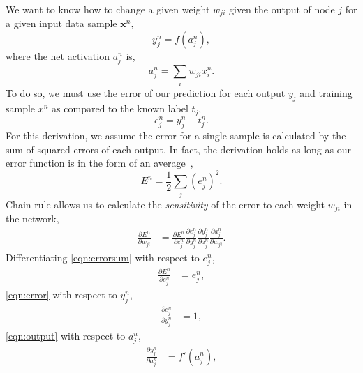 \documentclass[thesis]{subfiles}
\begin{document}
We want to know how to change a given weight $w_{ji}$ given the output of node $j$ for a given input data sample $\mathbf{x}^n$, 
\begin{equation}
	y^n_j = f\left( a^n_j \right),
	\label{eqn:output}
\end{equation}
where the net activation $a^n_j$ is,
\begin{equation}
	a^n_j = \sum_i w_{ji} x^n_{i}.
	\label{eqn:weightsum}
\end{equation}
To do so, we must use the error of our prediction for each output $y_j$ and training sample $x^n$ as compared to the known label $t_j$,
\begin{equation}
    e^n_j = y^n_j - t^n_j.
    \label{eqn:error}
\end{equation}
%
For this derivation, we assume the error for a single sample is calculated by the sum of squared errors of each output. In fact, the derivation holds as long as our error function is in the form of an average~\citep{Bishop1995},
\begin{equation}
    E^n = \frac{1}{2} \sum_j {\left(e^n_j\right)}^2.
    \label{eqn:errorsum}
\end{equation}
Chain rule allows us to calculate the \emph{sensitivity} of the error to each weight $w_{ji}$ in the network,
\begin{equation}
\begin{aligned}
    \frac{\partial E^n}{\partial w_{ji}} &= \frac{\partial E^n}{\partial e^n_j}\frac{\partial e^n_j}{\partial y^n_j} \frac{\partial y^n_j}{\partial a^n_j} \frac{\partial a^n_j}{\partial w_{ji}}.
\end{aligned}
\end{equation}
%
Differentiating \cref{eqn:errorsum} with respect to $e^n_j$,
\begin{equation}
\begin{aligned}
    \frac{\partial E^n}{\partial e^n_j} &= e^n_j,
\end{aligned}
\end{equation}
%
\cref{eqn:error} with respect to $y^n_j$,
\begin{equation}
\begin{aligned}
    \frac{\partial e^n_j}{\partial y^n_j} &= 1,
\end{aligned}
\end{equation}
%
\cref{eqn:output} with respect to $a^n_j$,
\begin{equation}
\begin{aligned}
   \frac{\partial y^n_j}{\partial a^n_j}  &= f'\left( a^n_j \right),
\end{aligned}
\label{eqn:partialdyda}
\end{equation}
\end{document}

